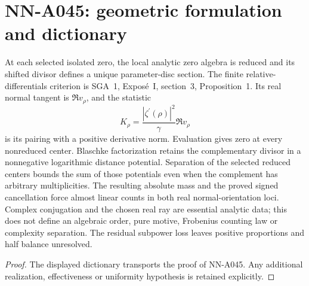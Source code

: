 \section{NN-A045: geometric formulation and dictionary}
\begin{geometricstatement}[NN-A045]
At each selected isolated zero, the local analytic zero algebra is reduced and its shifted divisor defines a unique parameter-disc section. The finite relative-differentials criterion is SGA~1, Expos\'e~I, section~3, Proposition~1. Its real normal tangent is $\Re v_\rho$, and the statistic \[K_\rho=\frac{|\zeta^\prime(\rho)|^2}{\gamma}\Re v_\rho\] is its pairing with a positive derivative norm. Evaluation gives zero at every nonreduced center. Blaschke factorization retains the complementary divisor in a nonnegative logarithmic distance potential. Separation of the selected reduced centers bounds the sum of those potentials even when the complement has arbitrary multiplicities. The resulting absolute mass and the proved signed cancellation force almost linear counts in both real normal-orientation loci. Complex conjugation and the chosen real ray are essential analytic data; this does not define an algebraic order, pure motive, Frobenius counting law or complexity separation. The residual subpower loss leaves positive proportions and half balance unresolved.
\end{geometricstatement}
\begin{proof} The displayed dictionary transports the proof of NN-A045. Any additional realization, effectiveness or uniformity hypothesis is retained explicitly.\end{proof}


